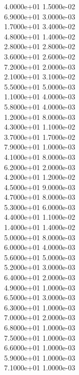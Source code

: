 \documentclass{article}
\begin{document}
{\indent    4.0000e+01   1.5000e-02\\
\indent    6.9000e+01   3.0000e-03\\
\indent    1.7000e+01   3.4000e-02\\
\indent    4.8000e+01   1.4000e-02\\
\indent    2.8000e+01   2.8000e-02\\
\indent    3.6000e+01   2.6000e-02\\
\indent    7.2000e+01   2.0000e-03\\
\indent    2.1000e+01   3.1000e-02\\
\indent    5.5000e+01   5.0000e-03\\
\indent    1.1000e+01   4.0000e-03\\
\indent    5.8000e+01   4.0000e-03\\
\indent    1.2000e+01   8.0000e-03\\
\indent    4.3000e+01   1.1000e-02\\
\indent    3.7000e+01   1.7000e-02\\
\indent    7.9000e+01   1.0000e-03\\
\indent    4.1000e+01   8.0000e-03\\
\indent    6.2000e+01   2.0000e-03\\
\indent    4.2000e+01   1.2000e-02\\
\indent    4.5000e+01   9.0000e-03\\
\indent    4.7000e+01   8.0000e-03\\
\indent    5.3000e+01   6.0000e-03\\
\indent    4.4000e+01   1.1000e-02\\
\indent    1.4000e+01   1.4000e-02\\
\indent    5.0000e+01   8.0000e-03\\
\indent    6.0000e+01   4.0000e-03\\
\indent    5.6000e+01   5.0000e-03\\
\indent    5.2000e+01   3.0000e-03\\
\indent    6.4000e+01   2.0000e-03\\
\indent    4.9000e+01   1.0000e-03\\
\indent    6.5000e+01   3.0000e-03\\
\indent    6.3000e+01   1.0000e-03\\
\indent    7.0000e+01   2.0000e-03\\
\indent    6.8000e+01   1.0000e-03\\
\indent    7.5000e+01   1.0000e-03\\
\indent    6.6000e+01   1.0000e-03\\
\indent    5.9000e+01   1.0000e-03\\
\indent    7.1000e+01   1.0000e-03\\
}
\end{document}
